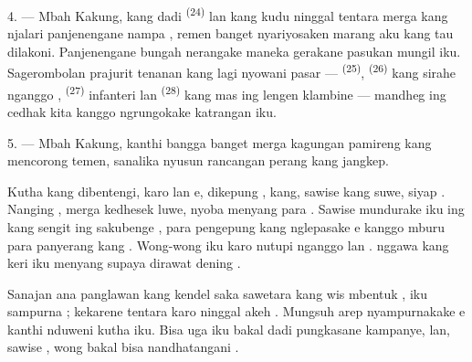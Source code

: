 \VUsaut{4.0mm}
\VUsaut{2.8mm}

4. --- Mbah Kakung, kang dadi 
\textsuperscript{(24)} lan kang kudu ninggal tentara merga
 kang njalari panjenengane nampa ,
remen banget nyariyosaken marang aku  kang
tau dilakoni. Panjenengane bungah nerangake maneka gerakane pasukan
mungil iku. Sagerombolan prajurit tenanan kang lagi nyowani pasar —
 \textsuperscript{(25)},  \textsuperscript{(26)} kang sirahe nganggo ,
 \textsuperscript{(27)} infanteri lan  \textsuperscript{(28)} kang  mas ing lengen
klambine — mandheg ing cedhak kita kanggo ngrungokake katrangan iku.

5. --- Mbah Kakung, kanthi bangga banget merga kagungan pamireng kang
mencorong temen, sanalika nyusun rancangan perang kang jangkep.

Kutha kang dibentengi, karo  lan e,
dikepung , kang, sawise  kang
suwe, siyap . Nanging , merga
kedhesek luwe, nyoba  menyang 
para . Sawise mundurake  iku ing
 kang sengit ing sakubenge ,
para pengepung kang  nglepasake e
kanggo mburu para panyerang kang . Wong-wong iku
 karo nutupi  nganggo  lan .  nggawa kang keri iku menyang  supaya dirawat
dening .

Sanajan ana panglawan kang kendel saka sawetara  kang
wis mbentuk ,  iku sampurna ;
kekarene tentara  karo ninggal akeh .
Mungsuh arep nyampurnakake e kanthi nduweni kutha
iku. Bisa uga iku bakal dadi pungkasane kampanye, lan, sawise
, wong bakal bisa nandhatangani
.

\VUsaut{4.4mm}
\VUsaut{2.8mm}

